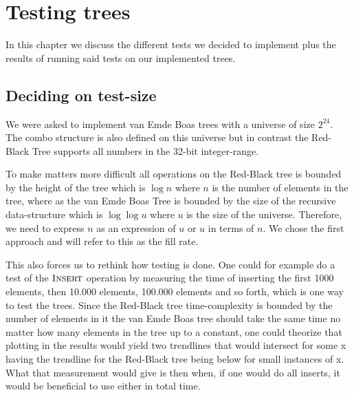 \documentclass[oneside,11pt,openright]{report}
\newcommand{\Insert}{\textsc{Insert}}
\begin{document}
\chapter{Testing trees}

In this chapter we discuss the different tests we decided to implement plus the results of running said tests on our implemented trees. 

\section{Deciding on test-size}
We were asked to implement van Emde Boas trees with a universe of size $2^{24}$. The combo structure is also defined on this universe but in contrast the Red-Black Tree supports all numbers in the 32-bit integer-range.

To make matters more difficult all operations on the Red-Black tree is bounded by the height of the tree which is $\log n$ where $n$ is the number of elements in the tree, where as the van Emde Boas Tree is bounded by the size of the recursive data-structure which is $\log \log u$ where $u$ is the size of the universe. Therefore, we need to express $n$ as an expression of $u$ or $u$ in terms of $n$. We chose the first approach and will refer to this as the fill rate.

This also forces us to rethink how testing is done. One could for example do a test of the $\Insert$ operation by measuring the time of inserting the first 1000 elements, then 10.000 elements, 100.000 elements and so forth, which is one way to test the trees. Since the Red-Black tree time-complexity is bounded by the number of elements in it the van Emde Boas tree should take the same time no matter how many elements in the tree up to a constant, one could theorize that plotting in the results would yield two trendlines that would intersect for some x having the trendline for the Red-Black tree being below for small instances of x. What that measurement would give is then when, if one would do all inserts, it would be beneficial to use either in total time.
\end{document}
